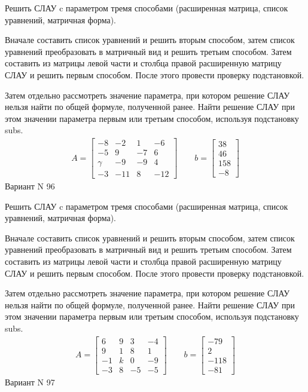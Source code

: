 \documentclass[11pt]{report}
\begin{document}
Решить СЛАУ c параметром тремя способами (расширенная матрица, список уравнений, матричная форма).

Вначале составить список уравнений и решить вторым способом,
затем список уравнений преобразовать в матричный вид и решить третьим способом.
Затем составить из матрицы левой части и столбца правой расширенную матрицу СЛАУ и решить первым способом.
После этого провести проверку подстановкой.

Затем отдельно рассмотреть значение параметра, при котором решение СЛАУ нельзя найти по общей формуле,
полученной ранее.
Найти решение СЛАУ при этом значении параметра первым или третьим способом, используя подстановку subs.
\begin{align*}
    A = \left[\begin{matrix}-8 & -2 & 1 & -6\\-5 & 9 & -7 & 6\\\gamma & -9 & -9 & 4\\-3 & -11 & 8 & -12\end{matrix}\right]
\qquad b = \left[\begin{matrix}38\\46\\158\\-8\end{matrix}\right]
\end{align*}
\newpage
Вариант N 96


Решить СЛАУ c параметром тремя способами (расширенная матрица, список уравнений, матричная форма).

Вначале составить список уравнений и решить вторым способом,
затем список уравнений преобразовать в матричный вид и решить третьим способом.
Затем составить из матрицы левой части и столбца правой расширенную матрицу СЛАУ и решить первым способом.
После этого провести проверку подстановкой.

Затем отдельно рассмотреть значение параметра, при котором решение СЛАУ нельзя найти по общей формуле,
полученной ранее.
Найти решение СЛАУ при этом значении параметра первым или третьим способом, используя подстановку subs.
\begin{align*}
    A = \left[\begin{matrix}6 & 9 & 3 & -4\\9 & 1 & 8 & 1\\-1 & k & 0 & -9\\-3 & 8 & -5 & -5\end{matrix}\right]
\qquad b = \left[\begin{matrix}-79\\2\\-118\\-81\end{matrix}\right]
\end{align*}
\newpage
Вариант N 97
\end{document}
